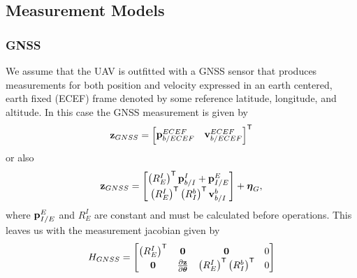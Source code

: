 \subsection{Measurement Models}

\subsubsection{GNSS}
We assume that the UAV is outfitted with a GNSS sensor that produces
measurements for both position and velocity expressed in an earth centered, earth
fixed (ECEF) frame denoted by some reference latitude, longitude, and altitude.
In this case the GNSS measurement is given by
\begin{equation}
  \boldsymbol{\mathrm{z}}_{GNSS} = 
  \begin{bmatrix}
    \boldsymbol{\mathrm{p}}_{b/ECEF}^{ECEF} & \boldsymbol{\mathrm{v}}_{b/ECEF}^{ECEF}
  \end{bmatrix}^{\mathsf{T}}
\end{equation}
or also
\begin{equation}
	\boldsymbol{\mathrm{z}}_{GNSS} = 
	\begin{bmatrix}
		\left(R_E^I\right)^{\mathsf{T}} \boldsymbol{\mathrm{p}}_{b/I}^I + \boldsymbol{\mathrm{p}}_{I/E}^E \\
		\left(R_E^I\right)^{\mathsf{T}} \left(R_I^b\right)^{\mathsf{T}}\boldsymbol{\mathrm{v}}_{b/I}^b \\
	\end{bmatrix} + \boldsymbol{\mathrm{\eta}}_G,
\end{equation}
where $\boldsymbol{\mathrm{p}}_{I/E}^E$ and $R_E^I$ are constant and must be calculated before operations.
This leaves us with the measurement jacobian given by
\begin{equation}
  H_{GNSS} =
  \begin{bmatrix}
    \left(R_E^I\right)^{\mathsf{T}} & \boldsymbol{\mathrm{0}} & \boldsymbol{\mathrm{0}} & 0 \\
    \boldsymbol{\mathrm{0}} & \frac{\partial \boldsymbol{\mathrm{z}}}{\partial \boldsymbol{\mathrm{\theta}}} & \left(R_E^I\right)^{\mathsf{T}}
      \left(R_I^b\right)^{\mathsf{T}} & 0
  \end{bmatrix}
\end{equation}

